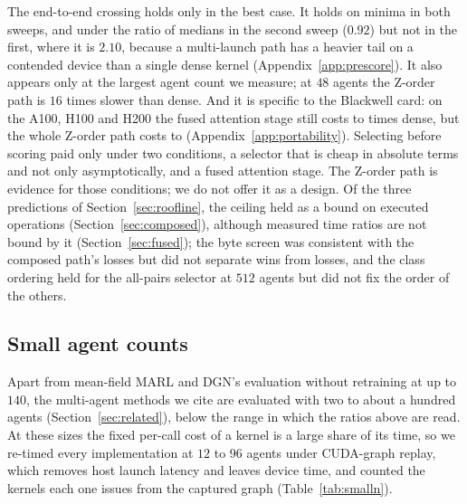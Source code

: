 The end-to-end crossing holds only in the best case. It holds on minima in both
sweeps, and under the ratio of medians in the second sweep ($0.92$) but not in the
first, where it is $2.10$, because a multi-launch path has a heavier tail on a
contended device than a single dense kernel (Appendix~\ref{app:prescore}). It
also appears only at the largest agent count we measure; at $48$ agents the
Z-order path is $16$ times slower than dense. And it is specific to the
Blackwell card: on the A100, H100 and H200 the fused attention stage still costs
\PortZorderAttendLo{} to \PortZorderAttendHi{} times dense, but the whole
Z-order path costs \PortZorderTotalLo{} to \PortZorderTotalHi{}
(Appendix~\ref{app:portability}). Selecting before scoring paid only under two
conditions, a selector that is cheap in absolute terms and not only
asymptotically, and a fused attention stage. The Z-order path is evidence for
those conditions; we do not offer it as a design. Of the three predictions of
Section~\ref{sec:roofline}, the ceiling held as a bound on executed operations
(Section~\ref{sec:composed}), although measured time ratios are not bound by it
(Section~\ref{sec:fused}); the
byte screen
was consistent with the composed path's losses but did not separate wins from
losses, and the class ordering held for the all-pairs selector at $512$ agents but did
not fix the order of the others.

\subsection{Small agent counts}
\label{sec:smalln}

Apart from mean-field MARL and DGN's evaluation without retraining at up to
$140$, the multi-agent methods we cite are evaluated with two to about a hundred
agents (Section~\ref{sec:related}), below the range in
which the ratios above are read. At these sizes the fixed per-call cost of a
kernel is a large share of its time, so we re-timed every implementation at
$12$ to $96$ agents under CUDA-graph replay, which removes host launch latency
and leaves device time, and counted the kernels each one issues from the
captured graph (Table~\ref{tab:smalln}).

\begin{table}[t]
\centering\small
\caption{Device time at the agent counts of current multi-agent methods, under
CUDA-graph replay: the best dense implementation's median, and each
implementation's median paired ratio against it ($d{=}16$, batch $256$, fp32,
three interleaved runs). The number under each name is the count of kernels it
issues per call. The $192$-agent row anchors the range of
Sections~\ref{sec:latency}--\ref{sec:prescore}.}
\label{tab:smalln}
\resizebox{\linewidth}{!}{}
\end{table}

